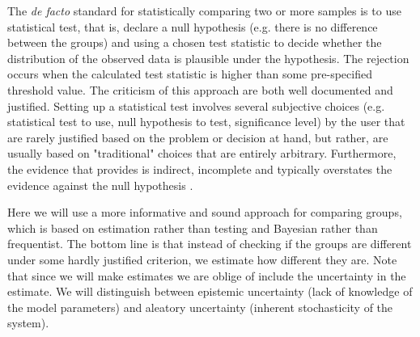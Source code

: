 \documentclass[11pt]{article}
\theoremstyle{definition}
\theoremstyle{remark}
\begin{document}
The \emph{de facto} standard for statistically comparing two or more samples is to use statistical test, that is, declare a null hypothesis (e.g. there is no difference between the groups) and using a chosen test statistic to decide whether the distribution of the observed data is plausible under the hypothesis. The rejection occurs when the calculated test statistic is higher than some pre-specified threshold value.
The criticism of this approach are both well documented and justified. Setting up a statistical test involves several subjective choices (e.g. statistical test to use, null hypothesis to test, significance level) by the user that are rarely justified based on the problem or decision at hand, but rather, are usually based on "traditional" choices that are entirely arbitrary\cite{aarts2012insignificance}. Furthermore, the evidence that provides is indirect, incomplete and typically overstates the evidence against the null hypothesis \cite{goodman1999toward}.

Here we will use a more informative and sound approach for comparing groups, which is based on estimation rather than testing and Bayesian rather than frequentist. The bottom line is that instead of checking if the groups are different under some hardly justified criterion, we estimate how different they are. Note that since we will make estimates we are oblige of include the uncertainty in the estimate. We will distinguish between epistemic uncertainty (lack of knowledge of the model parameters) and aleatory uncertainty (inherent stochasticity of the system).
\end{document}

